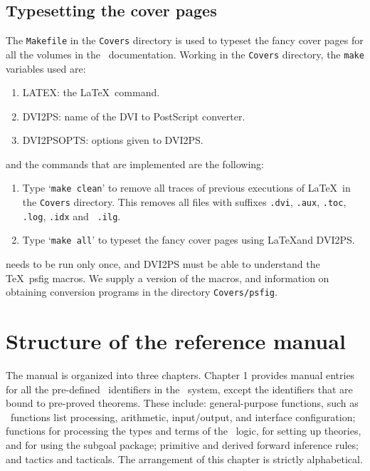 \documentclass[12pt]{article}
\def\latex{{\LaTeX}}
\begin{document}
\subsection{Typesetting the cover pages}\label{PS}

The {\tt Makefile} in the {\tt Covers} directory is used to typeset the
fancy cover pages for all the volumes in the \HOL\ documentation.  Working in
the {\tt Covers} directory, the {\tt make} variables used are:

\begin{enumerate}

\item {\small LATEX}:  the \LaTeX\ command.

\item {\small DVI2PS}: name of the {\small DVI} to PostScript converter.

\item {\small DVI2PSOPTS}: options given to {\small DVI2PS}.

\end{enumerate}

\noindent and the commands that are implemented are the following:

\begin{enumerate}

\item Type `{\tt make clean}' to remove all traces of previous executions of
\LaTeX\ in the {\tt Covers} directory.  This removes all files with
suffixes {\tt .dvi}, {\tt .aux}, {\tt .toc}, {\tt .log}, {\tt .idx} and {\tt
.ilg}.

\item Type `{\tt make all}' to typeset the fancy cover pages using
\latex and {\small DVI2PS}.

\end{enumerate}

 needs to be run only once, and {\small DVI2PS} must
be able to understand the \TeX\ psfig macros.  We supply a version of
the macros, and information on obtaining conversion programs in the
directory {\tt Covers/psfig}.

\section{Structure of the reference manual}

The manual is organized into three chapters.  Chapter 1 provides manual entries
for all the pre-defined \ML\ identifiers in the \HOL\ system, except the
identifiers that are bound to pre-proved theorems. These include:
general-purpose functions, such as \ML\ functions list processing, arithmetic,
input/output, and interface configuration; functions for processing the types
and terms of the \HOL\ logic, for setting up theories, and for using the
subgoal package; primitive and derived forward inference rules; and tactics and
tacticals.  The arrangement of this chapter is strictly alphabetical.
\end{document}
